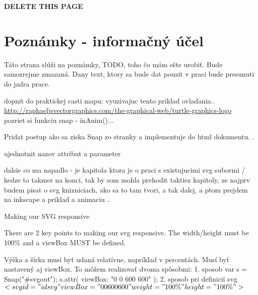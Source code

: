 {\Huge\textbf{ DELETE THIS PAGE}}
\section{Poznámky - informačný účel}
Táto strana slúži na poznámky, TODO, toho čo mám ešte urobiť. 
Bude samozrejme zmazaná.  
Dany text, ktory sa bude dat pouzit v praci bude presunuti do jadra prace. 

dopnit do praktickej casti mapu: vyuzivajuc tento priklad ovladania.. \url{http://raphaeljsvectorgraphics.com/the-graphical-web/turtle-graphics-logo}
pozriet si funkciu snap - inAnim()...


Pridat postup ako sa ziska Snap zo stranky a implementuje do html dokumentu. .

ujednotnit nazov attribut a parameter

dalsie co ma napadlo - je kapitola \cite[p.~81]{Dawber} ktora je o praci s existujucimi svg subormi / kedze to takmer na konci, tak by som mohla prehodit taktiez kapitoly, ze najprv budem pisat o svg knizniciach, ako sa to tam tvori, a tak dalej, a ptom prejdem na inkscape a priklad a animaciu .. 


Making our SVG responsive

There are 2 key points to making our svg responsive. The width/height must be 100\% and a viewBox MUST be defined.

Výška a šírka musí byť udaná relatívne, napríklad v percentách. Musí byť nastavený aj viewBox. 
To môžem realizovať dvoma spôsobmi:
1. sposob
var s = Snap("#svgout"); 
s.attr({ viewBox: "0 0 600 600" });
2. sposob pri definicii svg $ <svg id="idsvg" viewBox="0 0 600 600" weight="100\%" height="100\%"> $


